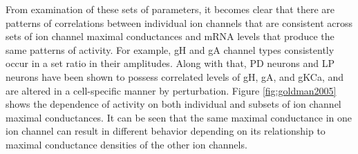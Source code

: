 From examination of these sets of parameters, it becomes clear that there are patterns of correlations between individual ion channels that are consistent across sets of ion channel maximal conductances and mRNA levels that produce the same patterns of activity. For example, \ac{gH} and \acf{gA} channel types consistently occur in a set ratio in their amplitudes\cite{maclean_activity-independent_2003,maclean_activity-independent_2005}. Along with that, \ac{PD} neurons and \ac{LP} neurons have been shown to possess correlated levels of \ac{gH}, \ac{gA}, and \ac{gKCa}, and are altered in a cell-specific manner by perturbation\cite{schulz_homeostatic_2017,temporal_neuromodulation_2011}.
Figure \ref{fig:goldman2005} shows the dependence of activity on both individual and subsets of ion channel maximal conductances. It can be seen that the same maximal conductance in one ion channel can result in different behavior depending on its relationship to maximal conductance densities of the other ion channels.

